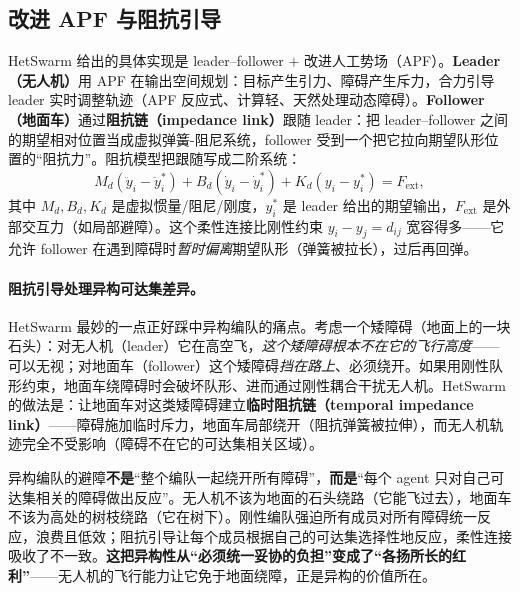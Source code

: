 \subsection{改进 APF 与阻抗引导}
\label{sec:hmr-formation-impedance}
HetSwarm 给出的具体实现是 leader--follower $+$ 改进人工势场（APF）。\textbf{Leader（无人机）}用 APF 在输出空间规划：目标产生引力、障碍产生斥力，合力引导 leader 实时调整轨迹（APF 反应式、计算轻、天然处理动态障碍）。\textbf{Follower（地面车）}通过\textbf{阻抗链（impedance link）}跟随 leader：把 leader--follower 之间的期望相对位置当成虚拟弹簧-阻尼系统，follower 受到一个把它拉向期望队形位置的“阻抗力”。阻抗模型把跟随写成二阶系统\cite{hogan1985impedance}：
\begin{equation}
  M_d(\ddot y_i - \ddot y_i^\ast) + B_d(\dot y_i - \dot y_i^\ast) + K_d(y_i - y_i^\ast) = F_{\mathrm{ext}},
  \label{eq:hmr-impedance}
\end{equation}
其中 $M_d,B_d,K_d$ 是虚拟惯量/阻尼/刚度，$y_i^\ast$ 是 leader 给出的期望输出，$F_{\mathrm{ext}}$ 是外部交互力（如局部避障）。这个柔性连接比刚性约束 $y_i-y_j=d_{ij}$ 宽容得多——它允许 follower 在遇到障碍时\emph{暂时偏离}期望队形（弹簧被拉长），过后再回弹。

\paragraph{阻抗引导处理异构可达集差异。}
HetSwarm 最妙的一点正好踩中异构编队的痛点。考虑一个矮障碍（地面上的一块石头）：对无人机（leader）它在高空飞，\emph{这个矮障碍根本不在它的飞行高度}——可以无视；对地面车（follower）这个矮障碍\emph{挡在路上}、必须绕开。如果用刚性队形约束，地面车绕障碍时会破坏队形、进而通过刚性耦合干扰无人机。HetSwarm 的做法是：让地面车对这类矮障碍建立\textbf{临时阻抗链（temporal impedance link）}——障碍施加临时斥力，地面车局部绕开（阻抗弹簧被拉伸），而无人机轨迹完全不受影响（障碍不在它的可达集相关区域）。

\begin{insight}
异构编队的避障\textbf{不是}“整个编队一起绕开所有障碍”，\textbf{而是}“每个 agent 只对自己可达集相关的障碍做出反应”。无人机不该为地面的石头绕路（它能飞过去），地面车不该为高处的树枝绕路（它在树下）。刚性编队强迫所有成员对所有障碍统一反应，浪费且低效；阻抗引导让每个成员根据自己的可达集选择性地反应，柔性连接吸收了不一致。\textbf{这把异构性从“必须统一妥协的负担”变成了“各扬所长的红利”}——无人机的飞行能力让它免于地面绕障，正是异构的价值所在。
\end{insight}

